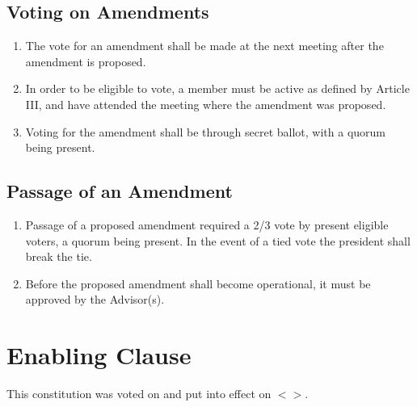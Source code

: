 \documentclass[english,11pt]{article}
\begin{document}
\subsection{Voting on Amendments}
\begin{enumerate}[label=\Alph*.]
\item The vote for an amendment shall be made at the next meeting after the amendment is proposed.
\item In order to be eligible to vote, a member must be active as defined by Article III, and have attended the meeting where the amendment was proposed.
\item Voting for the amendment shall be through secret ballot, with a quorum being present.
\end{enumerate}

\subsection{Passage of an Amendment}
\begin{enumerate}[label=\Alph*.]
\item Passage of a proposed amendment required a 2/3 vote by present eligible voters, a quorum being present. 
    In the event of a tied vote the president shall break the tie.
\item Before the proposed amendment shall become operational, it must be approved by the Advisor(s).
\end{enumerate}

\section{Enabling Clause}
This constitution was voted on and put into effect on $<>$.
\end{document}
